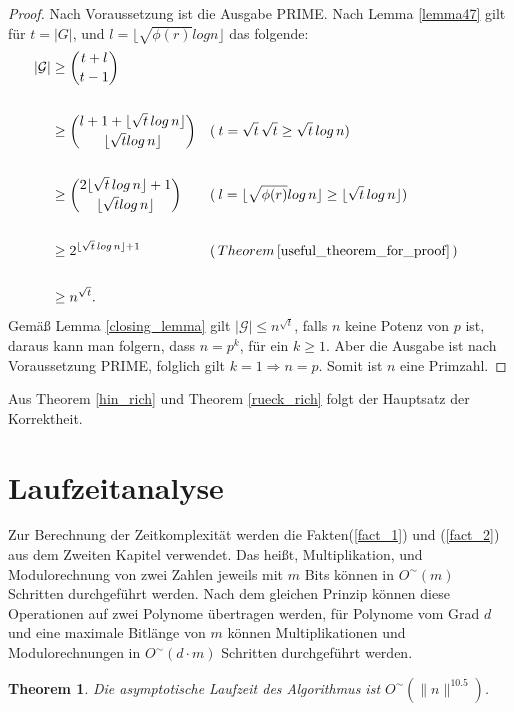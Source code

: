 \documentclass[12pt,oneside]{article}
\newtheorem{theorem}{Theorem}[section]
\theoremstyle{remark}
\theoremstyle{definition}
\begin{document}
\begin{proof}
Nach Voraussetzung ist die Ausgabe PRIME. Nach Lemma \ref{lemma47} gilt für $t = |G|$, und $l = \lfloor \sqrt{\phi(r)} log n \rfloor$ das folgende:\newline
\begin{align*}
|\mathcal{G}| & \geq {t + l \choose t - 1} \\
\\
& \geq {l + 1 + \lfloor \sqrt{t} \, log \, n \rfloor \choose \lfloor \sqrt{t} log \, n \rfloor} && ( \: t = \sqrt{t} \,
\sqrt{t} \geq \sqrt{t} \,  log \, n) && \\
\\
& \geq {2 \lfloor \sqrt{t} \, log \,  n \rfloor + 1 \choose \lfloor \sqrt{t} log \, n \rfloor} && ( \: l = \lfloor \sqrt{\phi(r)} log \, n \rfloor \geq \lfloor \sqrt{t} \, log \, n \rfloor)\\
\\
&\geq 2^{\lfloor \sqrt{t} \, log \, n \rfloor + 1} &&(\,  Theorem \,  \ref{useful_theorem_for_proof} \, )\\
\\
&\geq n^{\sqrt{t}}.
\end{align*}
Gemäß Lemma \ref{closing_lemma} gilt $|\mathcal{G}| \leq n^{\sqrt{t}}$, falls $n$ keine Potenz von $p$ ist, daraus kann man folgern, dass $n = p^k$, für ein $k \geq 1$. Aber die Ausgabe ist nach Voraussetzung PRIME, folglich gilt $ k= 1 \Rightarrow n = p$. Somit ist $n$ eine Primzahl.
\end{proof}

Aus Theorem \ref{hin_rich} und Theorem \ref{rueck_rich} folgt der Hauptsatz der Korrektheit. 
\section{Laufzeitanalyse}
Zur Berechnung der Zeitkomplexität werden die Fakten(\ref{fact_1}) und (\ref{fact_2}) aus dem Zweiten Kapitel verwendet. Das heißt, Multiplikation, und Modulorechnung von zwei Zahlen jeweils mit $m$ Bits können in $O^{\sim}( m )$ Schritten durchgeführt werden. Nach dem gleichen Prinzip können diese Operationen auf zwei Polynome übertragen werden, für Polynome vom Grad $d$ und eine maximale Bitlänge von  $m$ können Multiplikationen und Modulorechnungen in $O^{\sim}(d \cdot  m )$ Schritten durchgeführt werden.

\begin{theorem}
Die asymptotische Laufzeit des Algorithmus ist $O^{\sim}(\lVert n \rVert^{10.5})$. 
\end{theorem}
\end{document}
